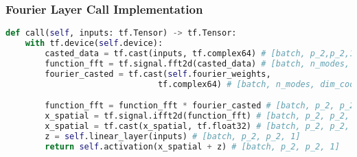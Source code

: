 \documentclass[aspectratio=169]{beamer}
\begin{document}
\begin{frame}[fragile]
\frametitle{Fourier Layer Call Implementation}

\begin{lstlisting}[language=Python]
def call(self, inputs: tf.Tensor) -> tf.Tensor:
    with tf.device(self.device):
        casted_data = tf.cast(inputs, tf.complex64) # [batch, p_2,p_2,1]
        function_fft = tf.signal.fft2d(casted_data) # [batch, n_modes, n_modes
        fourier_casted = tf.cast(self.fourier_weights, 
                               tf.complex64) # [batch, n_modes, dim_coords]

        function_fft = function_fft * fourier_casted # [batch, p_2, p_2, 1]
        x_spatial = tf.signal.ifft2d(function_fft) # [batch, p_2, p_2, 1]
        x_spatial = tf.cast(x_spatial, tf.float32) # [batch, p_2, p_2, 1]
        z = self.linear_layer(inputs) # [batch, p_2, p_2, 1]
        return self.activation(x_spatial + z) # [batch, p_2, p_2, 1]
\end{lstlisting}

\end{frame}
\end{document}
